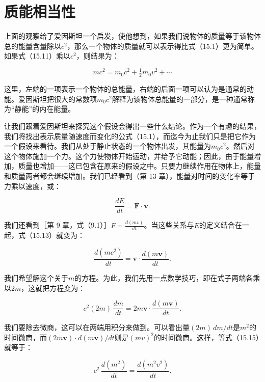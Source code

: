 \documentclass[12pt,oneside]{book}
\providecommand{\ddt}[2]{\frac{d#1}{d#2}}
\providecommand{\FLPvec}[1]{\boldsymbol{#1}}
\providecommand{\FLPF}[0]{\FLPvec{F}}
\providecommand{\FLPv}[0]{\FLPvec{v}}
\begin{document}
\section{质能相当性}
上面的观察给了爱因斯坦一个启发，使他想到，如果我们说物体的质量等于该物体总的能量含量除以$c^2$，那么一个物体的质量就可以表示得比式（15.1）更为简单。如果式（15.11）乘以$c^2$，则结果为：

\begin{equation}
\label{Eq:I:15:12}
mc^2=m_0c^2+\tfrac{1}{2}m_0v^2+\dotsb
\end{equation}

这里，左端的一项表示一个物体的总能量，右端的后面一项可以认为是通常的动能。爱因斯坦把很大的常数项$m_0c^2$解释为该物体总能量的一部分，是一种通常称为“静能”的内在能量。


让我们跟着爱因斯坦来探究这个假设会得出一些什么结论。作为一个有趣的结果，我们将找出表示质量随速度而变化的公式（15.1），而迄今为止我们只是把它作为一个假设来看待。我们从处于静止状态的一个物体出发，其能量为$m_0c^2$。然后对这个物体施加一个力。这个力使物体开始运动，并给予它动能；因此，由于能量增加，质量也增加——这已包含在原来的假设之中。只要力继续作用在物体上，能量和质量两者都会继续增加。我们已经看到（第 13 章），能量对时间的变化率等于力乘以速度，或：


\begin{equation}
\label{Eq:I:15:13}
\ddt{E}{t}=\FLPF\cdot \FLPv.
\end{equation}

我们还看到［第 9 章，式（9.1）］$F = \frac{d(mv)}{dt}$。当这些关系与$E$的定义结合在一起，式（15.13）就变为：


\begin{equation}
\label{Eq:I:15:14}
\ddt{(mc^2)}{t}=\FLPv\cdot\ddt{(m\FLPv)}{t}.
\end{equation}

我们希望解这个关于$m$的方程。为此，我们先用一点数学技巧，即在式子两端各乘以$2m$，这就把方程变为：


\begin{equation}
\label{Eq:I:15:15}
c^2(2m)\,\ddt{m}{t}=2m\FLPv\cdot\ddt{(m\FLPv)}{t}.
\end{equation}

我们要除去微商，这可以在两端用积分来做到。可以看出量$(2m)\,dm/dt$是$m^2$的时间微商，而$(2m\FLPv)\cdot d(m\FLPv)/dt$则是$(mv)^2$的时间微商。这样，等式（15.15）就等于：

\begin{equation}
\label{Eq:I:15:16}
c^2\,\ddt{(m^2)}{t}=\ddt{(m^2v^2)}{t}.
\end{equation}
\end{document}
